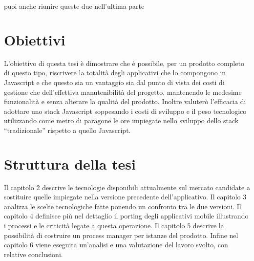 puoi anche riunire queste due nell'ultima parte 

\section{Obiettivi}\vspace{5mm}

	L’obiettivo di questa tesi è dimostrare che è possibile, per un prodotto completo di questo tipo, riscrivere la totalità degli applicativi che lo compongono in Javascript e che questo sia un vantaggio sia dal punto di vista dei costi di gestione che dell’effettiva manutenibilità del progetto, mantenendo le medesime funzionalità e senza alterare la qualità del prodotto. Inoltre valuterò l’efficacia di adottare uno stack Javascript soppesando i costi di sviluppo e il peso tecnologico utilizzando come metro di paragone le ore impiegate nello sviluppo dello stack “tradizionale” rispetto a quello Javascript.\vspace{5mm}
	
	\section{Struttura della tesi}\vspace{5mm}
	
Il capitolo 2 descrive le tecnologie disponibili attualmente sul mercato candidate a sostituire quelle impiegate nella versione precedente dell’applicativo. Il capitolo 3 analizza le scelte tecnologiche fatte ponendo un confronto tra le due versioni. Il capitolo 4 definisce più nel dettaglio il porting degli applicativi mobile illustrando i processi e le criticità legate a questa operazione. Il capitolo 5 descrive la possibilità di costruire un process manager per istanze del prodotto. Infine nel capitolo 6 viene eseguita un’analisi e una valutazione del lavoro svolto, con relative conclusioni. 


